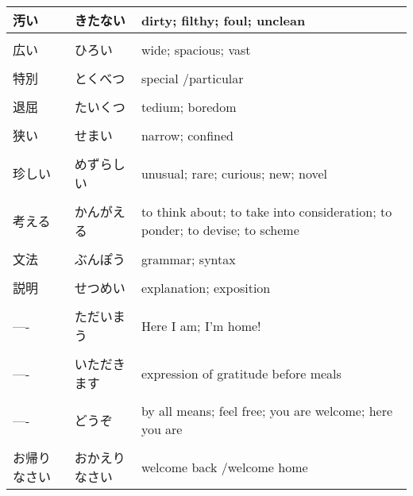 \documentclass{article}
\begin{document}
\begin{tabular}{ l | p{4cm} p{12cm} }
汚い & きたない & dirty; filthy; foul; unclean​ \\ \hline\\[-1em]
広い & ひろい & wide​; spacious; vast \\ \hline\\[-1em]
特別 & とくべつ & special /particular \\ \hline\\[-1em]
退屈 & たいくつ & tedium; boredom \\ \hline\\[-1em]
狭い & せまい & narrow; confined \\ \hline\\[-1em]
珍しい & めずらしい & unusual; rare; curious​; new; novel​ \\ \hline\\[-1em]
考える & かんがえる & to think about; to take into consideration; to ponder; to devise; to scheme​ \\ \hline\\[-1em]
文法 & ぶんぽう & grammar; syntax \\ \hline\\[-1em]
説明 & せつめい & explanation; exposition​ \\ \hline\\[-1em]
---- & ただいまう & Here I am; I'm home!​ \\ \hline\\[-1em]
---- & いただきます & expression of gratitude before meals​ \\ \hline\\[-1em]
---- & どうぞ & by all means; feel free; you are welcome​; here you are \\ \hline\\[-1em]
お帰りなさい & おかえりなさい & welcome back /welcome home %
\end{tabular}
\end{document}
